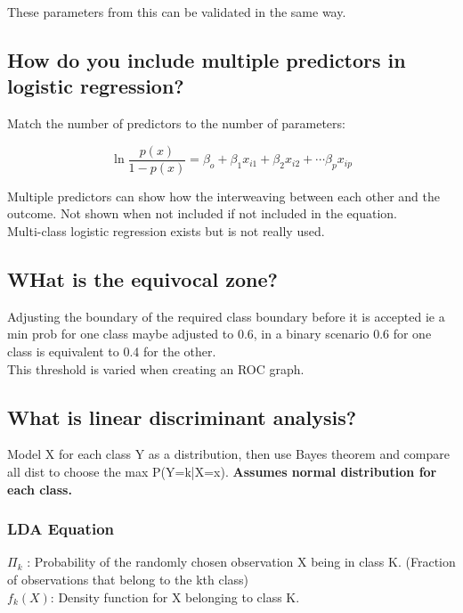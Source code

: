 \documentclass[11pt]{scrartcl} %
\begin{document}
These parameters from this can be validated in the same way.

\subsection{How do you include multiple predictors in logistic regression?}

Match the number of predictors to the number of parameters:

\begin{equation}
	\ln\frac{p(x)}{1-p(x)} = \beta_o + \beta_1x_{i1} + \beta_2x_{i2} + \cdots \beta_px_{ip}
\end{equation}

Multiple predictors can show how the interweaving between each other and the outcome. Not shown when not included if 
not included in the equation.\\

Multi-class logistic regression exists but is not really used.

\subsection{WHat is the equivocal zone?}

Adjusting the boundary of the required class boundary before it is accepted ie a min prob for one class maybe adjusted to
0.6, in a binary scenario 0.6 for one class is equivalent to 0.4 for the other.\\

This threshold is varied when creating an ROC graph.

\subsection{What is linear discriminant analysis?}

Model X for each class Y as a distribution, then use Bayes theorem and compare all dist to choose the max P(Y=k|X=x).
\textbf{Assumes normal distribution for each class.}

\subsubsection{LDA Equation}

\(\Pi_k\) : Probability of the randomly chosen observation X being in class K. (Fraction of observations that belong to the kth class)\\

\(f_k(X)\): Density function for X belonging to class K.
\end{document}
